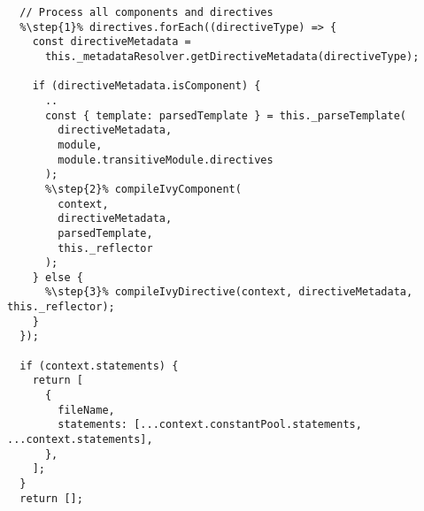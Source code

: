 \begin{verbatim}
  // Process all components and directives
  %\step{1}% directives.forEach((directiveType) => {
    const directiveMetadata =
      this._metadataResolver.getDirectiveMetadata(directiveType);

    if (directiveMetadata.isComponent) {
      ..
      const { template: parsedTemplate } = this._parseTemplate(
        directiveMetadata,
        module,
        module.transitiveModule.directives
      );
      %\step{2}% compileIvyComponent(
        context,
        directiveMetadata,
        parsedTemplate,
        this._reflector
      );
    } else {
      %\step{3}% compileIvyDirective(context, directiveMetadata, this._reflector);
    }
  });

  if (context.statements) {
    return [
      {
        fileName,
        statements: [...context.constantPool.statements, ...context.statements],
      },
    ];
  }
  return [];
\end{verbatim}
